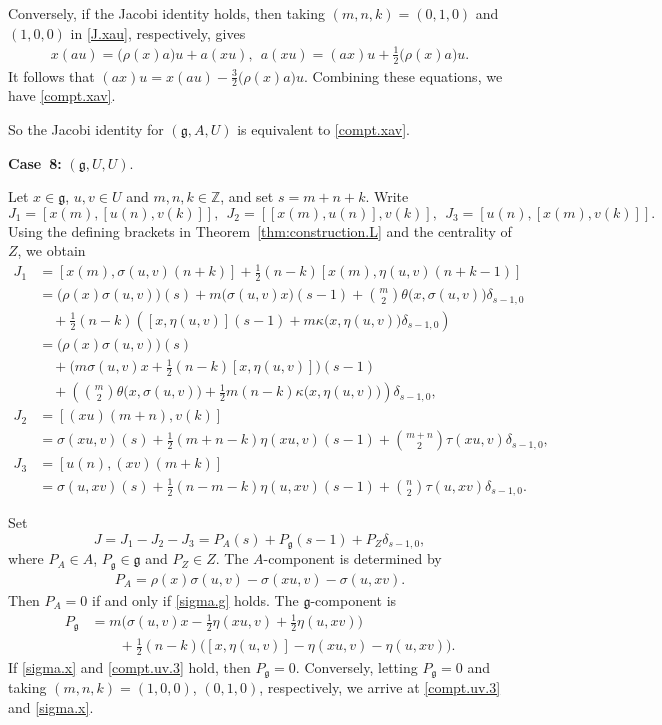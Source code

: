 \documentclass[12pt]{article}
\numberwithin{equation}{section}
\theoremstyle{definition}
\theoremstyle{plain}
\newcommand{\bZ}{\ensuremath{\mathbb{Z}}}
\newcommand{\afCase}[1]{\textbf{Case~#1:}}
\newcommand{\fg}{\mathfrak{g}}
\begin{document}
Conversely, if the Jacobi identity holds, then taking $(m,n,k)=(0,1,0)$ and $(1,0,0)$ in \eqref{J.xau}, respectively, gives 
\begin{align*}
    x(au)=\big(\rho(x)a\big)u+a(xu),\ \ a(xu)=(ax)u+\frac{1}{2}\big(\rho(x)a\big)u.
\end{align*}
It follows that $(ax)u=x(au)-\frac{3}{2}\big(\rho(x)a\big)u$. Combining these equations, we have \eqref{compt.xav}. 

So the Jacobi identity for $(\fg,A,U)$ is equivalent to \eqref{compt.xav}.

\afCase{8} $(\fg,U,U)$.

Let $x\in\fg$, $u,v\in U$ and $m,n,k\in\bZ$, and set $s=m+n+k$. Write
\begin{equation*}
    J_1=[x(m),[u(n),v(k)]],\ \ J_2=[[x(m),u(n)],v(k)],\ \ J_3=[u(n),[x(m),v(k)]].
\end{equation*}
Using the defining brackets in Theorem~\ref{thm:construction.L} and the centrality of $Z$, we obtain
\allowdisplaybreaks[4]
\begin{align*}
    J_1&=[x(m),\sigma(u,v)(n+k)]+\frac{1}{2}(n-k)[x(m),\eta(u,v)(n+k-1)]\\
    &=\big(\rho(x)\sigma(u,v)\big)(s)+m\big(\sigma(u,v)x\big)(s-1)+\binom{m}{2}\theta\big(x,\sigma(u,v)\big)\delta_{s-1,0}\\
    &\quad+\frac{1}{2}(n-k)\left([x,\eta(u,v)](s-1)+m\kappa\big(x,\eta(u,v)\big)\delta_{s-1,0}\right)\\
    &=\big(\rho(x)\sigma(u,v)\big)(s)\\
    &\quad+\big(m\sigma(u,v)x+\frac{1}{2}(n-k)[x,\eta(u,v)]\big)(s-1)\\
    &\quad+\left(\binom{m}{2}\theta\big(x,\sigma(u,v)\big)+\frac{1}{2}m(n-k)\kappa\big(x,\eta(u,v)\big)\right)\delta_{s-1,0},\\
    J_2&=[(xu)(m+n),v(k)]\\
    &=\sigma(xu,v)(s)+\frac{1}{2}(m+n-k)\eta(xu,v)(s-1)+\binom{m+n}{2}\tau(xu,v)\delta_{s-1,0},\\
    J_3&=[u(n),(xv)(m+k)]\\
    &=\sigma(u,xv)(s)+\frac{1}{2}(n-m-k)\eta(u,xv)(s-1)+\binom{n}{2}\tau(u,xv)\delta_{s-1,0}.
\end{align*}

Set
\begin{equation*}
    J=J_1-J_2-J_3=P_A(s)+P_\fg(s-1)+P_Z\delta_{s-1,0},
\end{equation*}
where $P_A\in A$, $P_\fg\in\fg$ and $P_Z\in Z$. The $A$-component is determined by
\begin{align*}
    P_A=\rho(x)\sigma(u,v)-\sigma(xu,v)-\sigma(u,xv).
\end{align*}
Then $P_A=0$ if and only if \eqref{sigma.g} holds. The $\fg$-component is 
\begin{align*}
    P_\fg&=m\big(\sigma(u,v)x-\frac{1}{2}\eta(xu,v)+\frac{1}{2}\eta(u,xv)\big)\\
    &\qquad+\frac{1}{2}(n-k)\big([x,\eta(u,v)]-\eta(xu,v)-\eta(u,xv)\big).
\end{align*}
If \eqref{sigma.x} and \eqref{compt.uv.3} hold, then $P_\fg=0$. Conversely, letting $P_\fg=0$ and taking $(m,n,k)=(1,0,0)$, $(0,1,0)$, respectively, we arrive at \eqref{compt.uv.3} and \eqref{sigma.x}.
\end{document}

